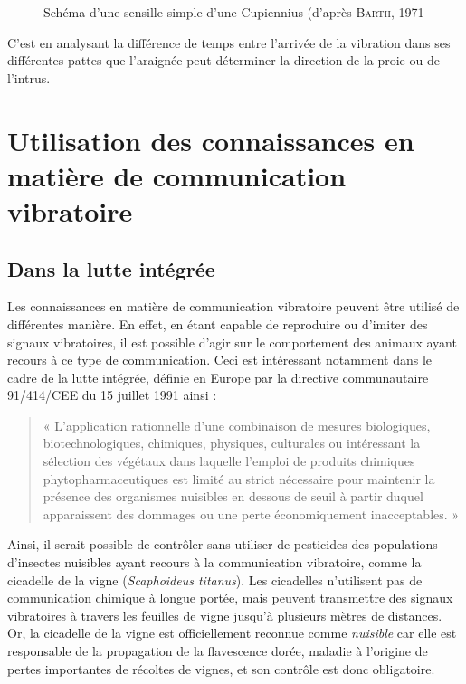 \begin{figure}[htb!]
	\centering
	\def\svgwidth{\columnwidth}
	
	\caption{Schéma d'une sensille simple d'une Cupiennius (d'après \textsc{Barth}, 1971}
\end{figure}

C'est en analysant la différence de temps entre l'arrivée de la
vibration dans ses différentes pattes que l'araignée peut déterminer la
direction de la proie ou de l'intrus.

\section{Utilisation des connaissances en matière de communication vibratoire}

\subsection{Dans la lutte intégrée}

Les connaissances en matière de communication vibratoire peuvent être
utilisé de différentes manière. En effet, en étant capable de reproduire
ou d'imiter des signaux vibratoires, il est possible d'agir sur le
comportement des animaux ayant recours à ce type de communication. Ceci
est intéressant notamment dans le cadre de la lutte intégrée, définie en
Europe par la directive communautaire 91/414/CEE du 15 juillet 1991
ainsi :

\begin{quote}
« L'application rationnelle d'une combinaison de mesures biologiques,
biotechnologiques, chimiques, physiques, culturales ou intéressant la
sélection des végétaux dans laquelle l'emploi de produits chimiques
phytopharmaceutiques est limité au strict nécessaire pour maintenir la
présence des organismes nuisibles en dessous de seuil à partir duquel
apparaissent des dommages ou une perte économiquement inacceptables. »
\end{quote}

Ainsi, il serait possible de contrôler sans utiliser de pesticides des
populations d'insectes nuisibles ayant recours à la communication
vibratoire, comme la cicadelle de la vigne (\emph{Scaphoideus titanus}).
Les cicadelles n'utilisent pas de communication chimique à longue
portée, mais peuvent transmettre des signaux vibratoires à travers les
feuilles de vigne jusqu'à plusieurs mètres de distances. Or, la
cicadelle de la vigne est officiellement reconnue comme \emph{nuisible}
car elle est responsable de la propagation de la flavescence dorée,
maladie à l'origine de pertes importantes de récoltes de vignes, et son
contrôle est donc obligatoire.

